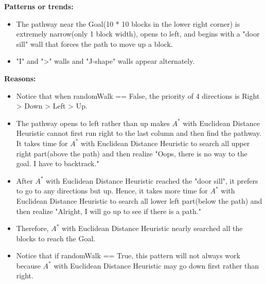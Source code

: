 \documentclass[letter]{article}
\begin{document}
\begin{enumerate}[resume]
\begin{enumerate}
\begin{enumerate}
				\textbf{Patterns or trends:} 
				\begin{itemize}
					\item {The pathway near the Goal(10 * 10 blocks in the lower right corner) is extremely narrow(only 1 block width), opens to left, and begins with a "door sill" wall that forces the path to move up a block.}
					
					\item {"I" and ">" walls and "J-shape" walls appear alternately.}
				\end{itemize}
				
				\textbf{Reasons:} 
				\begin{itemize}
					\item {Notice that when randomWalk == False, the priority of 4 directions is Right > Down > Left > Up.}
					\item {The pathway opens to left rather than up makes $ A^* $ with Euclidean Distance Heuristic cannot first run right to the last column and then find the pathway. It takes time for $ A^* $ with Euclidean Distance Heuristic to search all upper right part(above the path) and then realize "Oops, there is no way to the goal. I have to backtrack."}
					\item {After $ A^* $ with Euclidean Distance Heuristic reached the "door sill", it prefers to go to any directions but up. Hence, it takes more time for $ A^* $ with Euclidean Distance Heuristic to search all lower left part(below the path) and then realize "Alright, I will go up to see if there is a path."}
					\item {Therefore, $ A^* $ with Euclidean Distance Heuristic nearly searched all the blocks to reach the Goal.}
					\item {Notice that if randomWalk == True, this pattern will not always work because $ A^* $ with Euclidean Distance Heuristic may go down first rather than right.}
				\end{itemize}
				

\end{enumerate}
\end{enumerate}
\end{enumerate}
\end{document}
